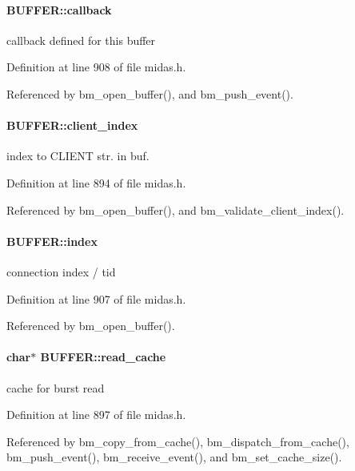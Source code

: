 \paragraph[{callback}]{ {\bf BUFFER::callback}}\hfill\label{structBUFFER_a9611e4a4e83bdf10fc85a02c6de72da5}
callback defined for this buffer 

Definition at line 908 of file midas.h.

Referenced by bm\_\-open\_\-buffer(), and bm\_\-push\_\-event().
\paragraph[{client\_\-index}]{ {\bf BUFFER::client\_\-index}}\hfill\label{structBUFFER_a4deee805992cb9841283440fb95d8a81}
index to CLIENT str. in buf. 

Definition at line 894 of file midas.h.

Referenced by bm\_\-open\_\-buffer(), and bm\_\-validate\_\-client\_\-index().
\paragraph[{index}]{ {\bf BUFFER::index}}\hfill\label{structBUFFER_a5e76aa98957c2f9c714ae9825ef4bb94}
connection index / tid 

Definition at line 907 of file midas.h.

Referenced by bm\_\-open\_\-buffer().
\paragraph[{read\_\-cache}]{\setlength{\rightskip}{0pt plus 5cm}char$\ast$ {\bf BUFFER::read\_\-cache}}\hfill\label{structBUFFER_a5d4cfe9131aaa09843127a5b134215c5}
cache for burst read 

Definition at line 897 of file midas.h.

Referenced by bm\_\-copy\_\-from\_\-cache(), bm\_\-dispatch\_\-from\_\-cache(), bm\_\-push\_\-event(), bm\_\-receive\_\-event(), and bm\_\-set\_\-cache\_\-size().
